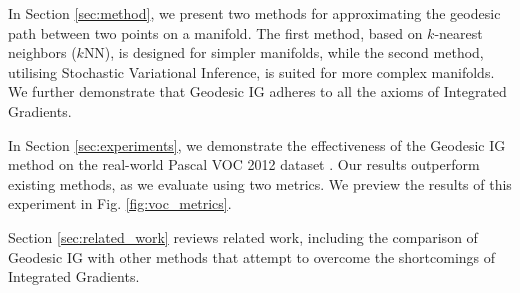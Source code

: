 In Section \ref{sec:method}, we present two methods for approximating the geodesic path between two points on a manifold. The first method, based on $k$-nearest neighbors ($k$NN), is designed for simpler manifolds, while the second method, utilising Stochastic Variational Inference, is suited for more complex manifolds. We further demonstrate that Geodesic IG adheres to all the axioms of Integrated Gradients.


In Section \ref{sec:experiments}, we demonstrate the effectiveness of the Geodesic IG method on the real-world Pascal VOC 2012 dataset \citep{pascal-voc-2012}. Our results outperform existing methods, as we evaluate using two metrics. We preview the results of this experiment in Fig. \ref{fig:voc_metrics}.

Section \ref{sec:related_work} reviews related work, including the comparison of Geodesic IG with other methods that attempt to overcome the shortcomings of Integrated Gradients.
